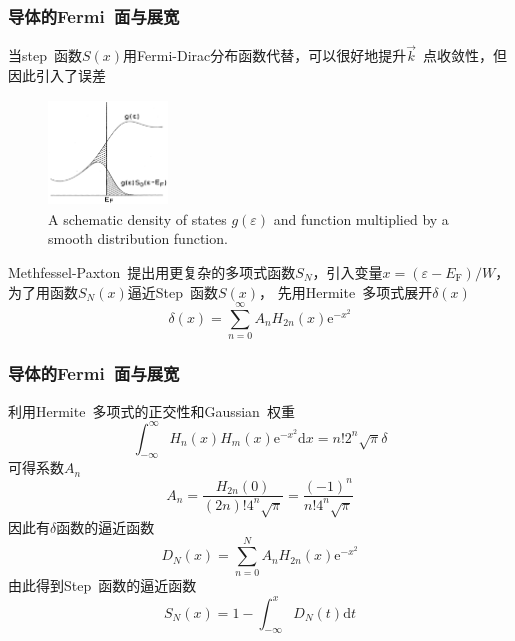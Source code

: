 {\frame
{
	\frametitle{导体的\textrm{Fermi}~面与展宽}
	当\textrm{step~}函数$S(x)$用\textrm{Fermi-Dirac}分布函数代替，可以很好地提升$\vec k$~点收敛性，但因此引入了误差
	\begin{figure}[h!]
	\centering
	\vspace*{-0.2in}
	\includegraphics[height=1.1in,width=1.25in,viewport=0 0 530 500,clip]{Figures/MP_distribution.png}
	\caption{\textrm{A schematic density of states $g(\varepsilon)$ and function multiplied by a smooth distribution function.}}%
	\label{MP_distribution}
	\end{figure} 
	\textrm{Methfessel-Paxton~}提出用更复杂的多项式函数$S_N$，引入变量$x=(\varepsilon-E_{\mathrm F})/W$，为了用函数$S_N(x)$逼近\textrm{Step~}函数$S(x)$，%
	先用\textrm{Hermite~}多项式展开$\delta(x)$
	\vspace*{-8pt}
	\begin{displaymath}
		\delta(x)=\sum_{n=0}^{\infty}A_nH_{2n}(x)\mathrm{e}^{-x^2}
	\end{displaymath}
}

\frame
{
	\frametitle{导体的\textrm{Fermi}~面与展宽}
	利用\textrm{Hermite~}多项式的正交性和\textrm{Gaussian~}权重
	\begin{displaymath}
		\int_{-\infty}^{\infty}H_n(x)H_m(x)\mathrm{e}^{-x^2}\mathrm{d}x=n!2^n\sqrt{\pi}\delta
	\end{displaymath}
	可得系数$A_n$
	\begin{displaymath}
		A_n=\frac{H_{2n}(0)}{(2n)!4^n\sqrt{\pi}}=\frac{(-1)^n}{n!4^n\sqrt{\pi}}
	\end{displaymath}
	因此有$\delta$函数的逼近函数
	\begin{displaymath}
		D_N(x)=\sum_{n=0}^NA_nH_{2n}(x)\mathrm{e}^{-x^2}
	\end{displaymath}
	由此得到\textrm{Step}~函数的逼近函数
	\begin{displaymath}
		S_N(x)=1-\int_{-\infty}^xD_N(t)\mathrm{d}t
	\end{displaymath}
}

}
